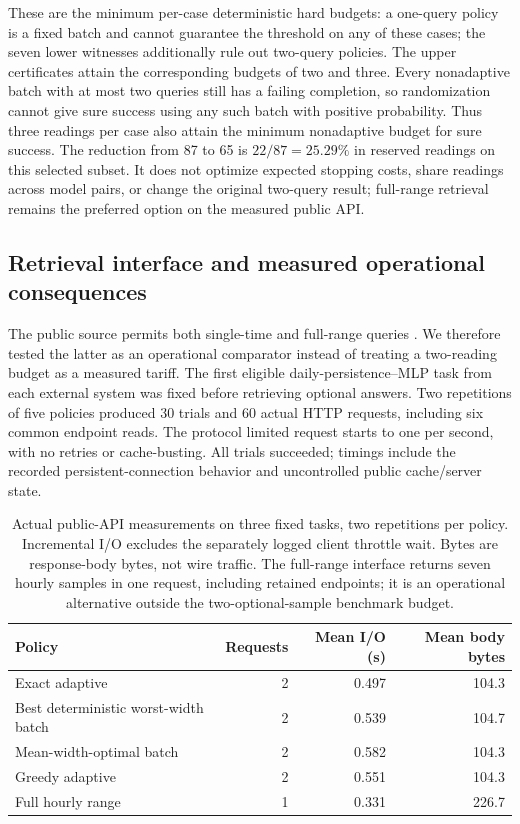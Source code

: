 \documentclass[12pt]{article}
\begin{document}
These are the minimum per-case deterministic hard budgets: a one-query
policy is a fixed batch and cannot guarantee the threshold on any of these
cases; the seven lower witnesses additionally rule out two-query policies.
The upper certificates attain the corresponding budgets of two and three.
Every nonadaptive batch with at most two queries still has a failing
completion, so randomization cannot give sure success using any such batch
with positive probability. Thus three readings per case also attain the
minimum nonadaptive budget for sure success. The reduction from 87 to 65 is
$22/87=25.29\%$ in reserved readings on this selected subset. It does not
optimize expected stopping costs, share readings across model pairs, or
change the original two-query result; full-range retrieval remains the
preferred option on the measured public API.
\FloatBarrier
\subsection{Retrieval interface and measured operational consequences}
\label{sec:actual-api}
The public source permits both single-time and full-range queries
\citep{hpmapi,hpmcode}. We therefore tested the latter as an operational
comparator instead of treating a two-reading budget as a measured tariff.
The first eligible daily-persistence--MLP task from each external system
was fixed before retrieving optional answers. Two repetitions of five
policies produced 30 trials and 60 actual HTTP requests, including six
common endpoint reads. The protocol limited request starts to one per
second, with no retries or cache-busting. All trials succeeded; timings
include the recorded persistent-connection behavior and uncontrolled
public cache/server state.

\begin{table}[htbp]\centering\small
\caption{Actual public-API measurements on three fixed tasks, two
repetitions per policy. Incremental I/O excludes the separately logged
client throttle wait. Bytes are response-body bytes, not wire traffic.
The full-range interface returns seven hourly samples in one request,
including retained endpoints; it is an operational alternative outside
the two-optional-sample benchmark budget.}\label{tab:actual-api}
\begin{tabular}{lrrr}\toprule
Policy & Requests & Mean I/O (s) & Mean body bytes\\\midrule
Exact adaptive & 2 & 0.497 & 104.3\\
Best deterministic worst-width batch & 2 & 0.539 & 104.7\\
Mean-width-optimal batch & 2 & 0.582 & 104.3\\
Greedy adaptive & 2 & 0.551 & 104.3\\
Full hourly range & 1 & 0.331 & 226.7\\\bottomrule
\end{tabular}\end{table}
\end{document}
